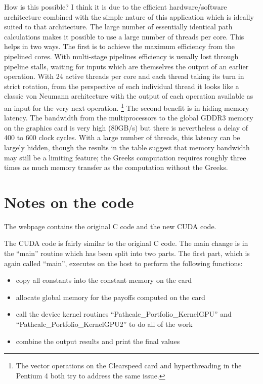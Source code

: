\documentclass[12pt]{article}
\begin{document}
How is this possible?  I think it is due to the efficient hardware/software
architecture combined with the simple nature of this application which 
is ideally suited to that architecture.  The large number of essentially
identical path calculations makes it possible to use a large number of 
threads per core.  This helps in two ways.  The first is to achieve the 
maximum efficiency from the pipelined cores.  With multi-stage pipelines 
efficiency is usually lost through pipeline stalls, waiting for inputs 
which are themselves the output of an earlier operation.  With 24 active 
threads per core and each thread taking its turn in strict rotation, 
from the perspective of each individual thread it looks like a classic 
von Neumann architecture with the output of each operation available as 
an input for the very next operation.%
\footnote{
The vector operations on the Clearspeed card and hyperthreading in the 
Pentium 4 both try to address the same issue.}
The second benefit is in hiding memory latency.  The bandwidth from the
multiprocessors to the global GDDR3 memory on the graphics card is very high
(80GB/s) but there is nevertheless a delay of 400 to 600 clock cycles.
With a large number of threads, this latency can be largely hidden, though 
the results in the table suggest that memory bandwidth may still be a 
limiting feature; the Greeks computation requires roughly three times 
as much memory transfer as the computation without the Greeks.


\newpage

\section{Notes on the code}

The webpage contains the original C code and the new CUDA code.

The CUDA code is fairly similar to the original C code.  The main change 
is in the ``main'' routine which has been split into two parts.
The first part, which is again called ``main'', executes on the host 
to perform the following functions:
\begin{itemize}
\item
copy all constants into the constant memory on the card
\item
allocate global memory for the payoffs computed on the card
\item
call the device kernel routines  ``Pathcalc\_Portfolio\_KernelGPU'' 
and  ``Pathcalc\_Portfolio\_KernelGPU2'' to do all of the work
\item
combine the output results and print the final values
\end{itemize}
\end{document}
